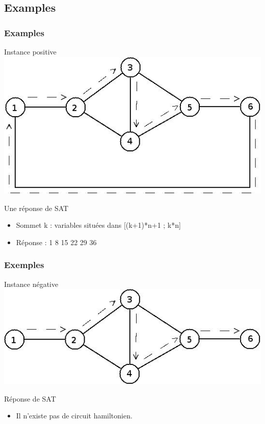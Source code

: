 \subsection{Examples}

\begin{frame}
\frametitle{Examples}
\begin{block}{Instance positive}
\includegraphics[scale=0.3]{positif.jpeg}
\end{block}
\begin{block}{Une r\'eponse de SAT}
  \begin{itemize}
  \item Sommet k : variables situ\'ees dans [(k+1)*n+1 ; k*n]
  \item R\'eponse : 1 8 15 22 29 36 
  \end{itemize}
\end{block}
\end{frame}

\begin{frame}
\frametitle{Exemples}
\begin{block}{Instance n\'egative}
\includegraphics[scale=0.3]{negatif.jpeg}
\end{block}
\begin{block}{R\'eponse de SAT}
  \begin{itemize}
  \item Il n'existe pas de circuit hamiltonien.
  \end{itemize}
\end{block}
\end{frame}